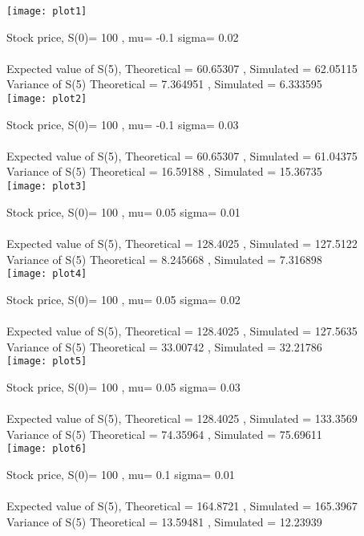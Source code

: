 \documentclass{article}
\begin{document}
\texttt{[image: plot1]}
\pagebreak 


Stock price, S(0)= 100 , mu= -0.1  sigma= 0.02 \\\\
 Expected value of S(5), Theoretical =  60.65307 , Simulated =  62.05115 \\
 Variance of S(5) Theoretical =  7.364951 , Simulated =  6.333595 \\

\texttt{[image: plot2]}
\pagebreak 


Stock price, S(0)= 100 , mu= -0.1  sigma= 0.03 \\\\
 Expected value of S(5), Theoretical =  60.65307 , Simulated =  61.04375 \\
 Variance of S(5) Theoretical =  16.59188 , Simulated =  15.36735 \\

\texttt{[image: plot3]}
\pagebreak 


Stock price, S(0)= 100 , mu= 0.05  sigma= 0.01 \\\\
 Expected value of S(5), Theoretical =  128.4025 , Simulated =  127.5122 \\
 Variance of S(5) Theoretical =  8.245668 , Simulated =  7.316898 \\

\texttt{[image: plot4]}
\pagebreak 


Stock price, S(0)= 100 , mu= 0.05  sigma= 0.02 \\\\
 Expected value of S(5), Theoretical =  128.4025 , Simulated =  127.5635 \\
 Variance of S(5) Theoretical =  33.00742 , Simulated =  32.21786 \\

\texttt{[image: plot5]}
\pagebreak 


Stock price, S(0)= 100 , mu= 0.05  sigma= 0.03 \\\\
 Expected value of S(5), Theoretical =  128.4025 , Simulated =  133.3569 \\
 Variance of S(5) Theoretical =  74.35964 , Simulated =  75.69611 \\

\texttt{[image: plot6]}
\pagebreak 


Stock price, S(0)= 100 , mu= 0.1  sigma= 0.01 \\\\
 Expected value of S(5), Theoretical =  164.8721 , Simulated =  165.3967 \\
 Variance of S(5) Theoretical =  13.59481 , Simulated =  12.23939 \\
\end{document}
